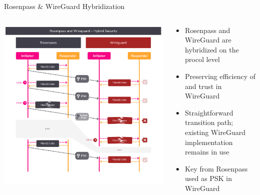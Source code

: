 \begin{frame}{Rosenpass \& WireGuard Hybridization}
  \begin{columns}[c]

    \begin{column}{.6\linewidth}
      \includegraphics[height=\textheight, clip=true,trim=0cm .5cm 0cm 3.2cm,padding=-1cm 0cm 0cm 0cm]{graphics/rosenpass-wireguard-hybrid-security.pdf}
    \end{column}

    \begin{column}{.4\linewidth}
      \small
      \begin{itemize}
        \item Rosenpass and WireGuard are hybridized on the procol level
        \item Preserving efficiency of and trust in WireGuard
        \item Straightforward transition path; existing WireGuard implementation remains in use
        \item Key from Rosenpass used as PSK in WireGuard
      \end{itemize}
    \end{column}

  \end{columns}
\end{frame}
